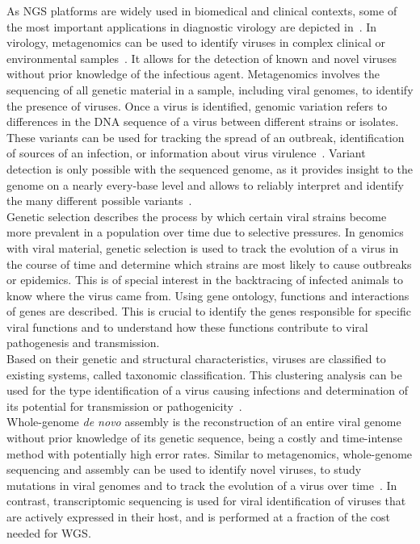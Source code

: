 As \ac{NGS} platforms are widely used in biomedical and clinical contexts, some of the most important applications in diagnostic virology are depicted in~. In virology, metagenomics can be used to identify viruses in complex clinical or environmental samples~\cite{chiu2019clinical}. It allows for the detection of known and novel viruses without prior knowledge of the infectious agent. Metagenomics involves the sequencing of all genetic material in a sample, including viral genomes, to identify the presence of viruses. Once a virus is identified, genomic variation refers to differences in the \ac{DNA} sequence of a virus between different strains or isolates. These variants can be used for tracking the spread of an outbreak, identification of sources of an infection, or information about virus virulence~\cite{capobianchi2013next}. Variant detection is only possible with the sequenced genome, as it provides insight to the genome on a nearly every-base level and allows to reliably interpret and identify the many different possible variants~\cite{koboldt2013next}. \\ 
Genetic selection describes the process by which certain viral strains become more prevalent in a population over time due to selective pressures. In genomics with viral material, genetic selection is used to track the evolution of a virus in the course of time and determine which strains are most likely to cause outbreaks or epidemics. This is of special interest in the backtracing of infected animals to know where the virus came from. Using gene ontology, functions and interactions of genes are described. This is crucial to identify the genes responsible for specific viral functions and to understand how these functions contribute to viral pathogenesis and transmission. \\
Based on their genetic and structural characteristics, viruses are classified to existing systems, called taxonomic classification. This clustering analysis can be used for the type identification of a virus causing infections and determination of its potential for transmission or pathogenicity~\cite{dutilh2021perspective}.\\
Whole-genome \textit{de novo} assembly is the reconstruction of an entire viral genome without prior knowledge of its genetic sequence, being a costly and time-intense method with potentially high error rates. Similar to metagenomics, whole-genome sequencing and assembly can be used to identify novel viruses, to study mutations in viral genomes and to track the evolution of a virus over time~\cite{slatko2018overview}. In contrast, transcriptomic sequencing is used for viral identification of viruses that are actively expressed in their host, and is performed at a fraction of the cost needed for \ac{WGS}.

